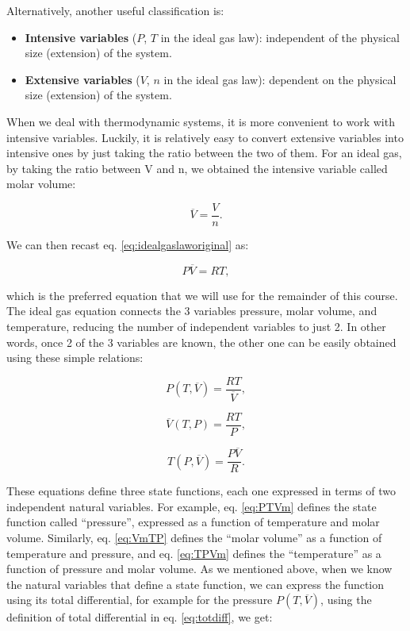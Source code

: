 \documentclass[
  9pt,
]{extbook}
\providecommand{\tightlist}{%
  \setlength{\itemsep}{0pt}\setlength{\parskip}{0pt}}
\theoremstyle{definition}
\theoremstyle{definition}
\theoremstyle{definition}
\theoremstyle{remark}
\begin{document}
Alternatively, another useful classification is:

\begin{itemize}
\tightlist
\item
  \textbf{Intensive variables} (\(P\), \(T\) in the ideal gas law): independent of the physical size (extension) of the system.
\item
  \textbf{Extensive variables} (\(V\), \(n\) in the ideal gas law): dependent on the physical size (extension) of the system.
\end{itemize}

When we deal with thermodynamic systems, it is more convenient to work with intensive variables. Luckily, it is relatively easy to convert extensive variables into intensive ones by just taking the ratio between the two of them. For an ideal gas, by taking the ratio between V and n, we obtained the intensive variable called molar volume:

\begin{equation}
  \overline{V}=\frac{V}{n}.   
  \label{eq:Vmdef}
\end{equation}

We can then recast eq. \eqref{eq:idealgaslaworiginal} as:

\begin{equation}
  P\overline{V}=RT,
  \label{eq:idealgaslaw}
\end{equation}

which is the preferred equation that we will use for the remainder of this course.
The ideal gas equation connects the 3 variables pressure, molar volume, and temperature, reducing the number of independent variables to just 2. In other words, once 2 of the 3 variables are known, the other one can be easily obtained using these simple relations:

\begin{equation}
  P(T,\overline{V})=\frac{RT}{\overline{V}},
  \label{eq:PTVm}
\end{equation}

\begin{equation}
  \overline{V}(T,P)=\frac{RT}{P},
  \label{eq:VmTP}
 \end{equation}

\begin{equation}
  T(P,\overline{V})=\frac{P\overline{V}}{R}.
  \label{eq:TPVm}
\end{equation}

These equations define three state functions, each one expressed in terms of two independent natural variables. For example, eq. \eqref{eq:PTVm} defines the state function called ``pressure'', expressed as a function of temperature and molar volume. Similarly, eq. \eqref{eq:VmTP} defines the ``molar volume'' as a function of temperature and pressure, and eq. \eqref{eq:TPVm} defines the ``temperature'' as a function of pressure and molar volume. As we mentioned above, when we know the natural variables that define a state function, we can express the function using its total differential, for example for the pressure \(P(T, \overline{V})\), using the definition of total differential in eq. \eqref{eq:totdiff}, we get:
\end{document}
